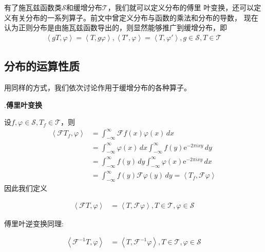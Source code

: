 有了施瓦兹函数类$\mathcal{S} $和缓增分布$\mathcal{T} $，我们就可以定义分布的傅里
叶变换，还可以定义有关分布的一系列算子。前文中曾定义分布与函数的乘法和分布的导数，
现在认为正则分布是由施瓦兹函数导出的，则显然能够推广到缓增分布，即\begin{align}
    \left\langle gT,\varphi\right\rangle=\left\langle T,g\varphi\right\rangle,\left\langle T',\varphi\right\rangle=\left\langle T,\varphi'\right\rangle,g\in\mathcal{S} ,T\in\mathcal{T}
\end{align}

\subsection{分布的运算性质}\label{sub:operation_of_distribution}
用同样的方式，我们依次讨论作用于缓增分布的各种算子。

.\textbf{傅里叶变换}

设$f,\varphi\in\mathcal{S} ,T_f\in\mathcal{T} $，则
\begin{align*}
    \left\langle\mathcal{F}T_f,\varphi\right\rangle & =\int_{-\infty}^{\infty}\mathcal{F}f(x)\varphi(x)\,dx                                       \\
                                         & =\int_{-\infty}^{\infty}\varphi(x)\,dx\int_{-\infty}^{\infty}f(y)\mathrm{e}^{-2\pi ixy}\,dy          \\
                                         & =\int_{-\infty}^{\infty}f(y)\,dy\int_{-\infty}^{\infty}\varphi(x)\mathrm{e}^{-2\pi ixy}\,dx          \\
                                         & =\int_{-\infty}^{\infty}f(y)\mathcal{F}\varphi(y)\,dy=\left\langle T_f,\mathcal{F}\varphi\right\rangle
\end{align*}
因此我们定义\begin{definition}[分布的傅里叶变换]
    \begin{align*}
        \left\langle \mathcal{F} T,\varphi\right\rangle & =\left\langle T,\mathcal{F} \varphi\right\rangle,T\in\mathcal{T} ,\varphi\in\mathcal{S}
    \end{align*}
\end{definition}

傅里叶逆变换同理:
\begin{definition}[分布的傅里叶反变换]
    \begin{align*}
        \left\langle \mathcal{F} ^{-1}T,\varphi\right\rangle & =\left\langle T,\mathcal{F} ^{-1}\varphi\right\rangle,T\in\mathcal{T} ,\varphi\in\mathcal{S}
    \end{align*}
\end{definition}

